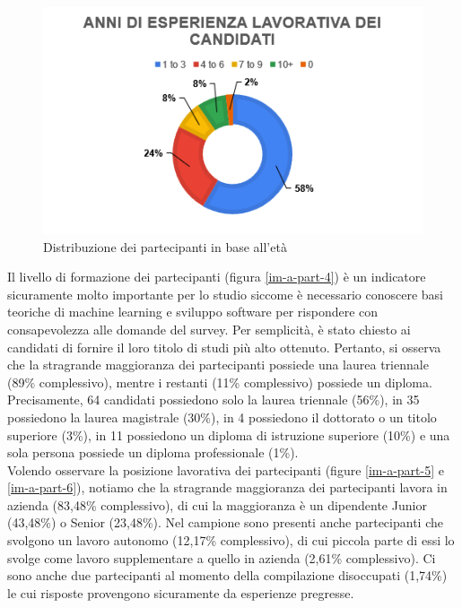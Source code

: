 \begin{figure}[h!]
    \centering
    \includegraphics[width=1\textwidth]{figure/data-analysis/anni.png}
    \caption{Distribuzione dei partecipanti in base all'età}
    \label{im-a-part-8}
\end{figure}

Il livello di formazione dei partecipanti (figura \ref{im-a-part-4}) è un indicatore sicuramente molto importante per lo studio siccome è necessario conoscere basi teoriche di machine learning e sviluppo software per rispondere con consapevolezza alle domande del survey. Per semplicità, è stato chiesto ai candidati di fornire il loro titolo di studi più alto ottenuto. Pertanto, si osserva che la stragrande maggioranza dei partecipanti possiede una laurea triennale (89\% complessivo), mentre i restanti (11\% complessivo) possiede un diploma. Precisamente, 64 candidati possiedono solo la laurea triennale (56\%), in 35 possiedono la laurea magistrale (30\%), in 4 possiedono il dottorato o un titolo superiore (3\%), in 11 possiedono un diploma di istruzione superiore (10\%) e una sola persona possiede un diploma professionale (1\%).\\

Volendo osservare la posizione lavorativa dei partecipanti (figure \ref{im-a-part-5} e \ref{im-a-part-6}), notiamo che la stragrande maggioranza dei partecipanti lavora in azienda (83,48\% complessivo), di cui la maggioranza è un dipendente Junior (43,48\%) o Senior (23,48\%). Nel campione sono presenti anche partecipanti che svolgono un lavoro autonomo (12,17\% complessivo), di cui piccola parte di essi lo svolge come lavoro supplementare a quello in azienda (2,61\% complessivo). Ci sono anche due partecipanti al momento della compilazione disoccupati (1,74\%) le cui risposte provengono sicuramente da esperienze pregresse.\\

